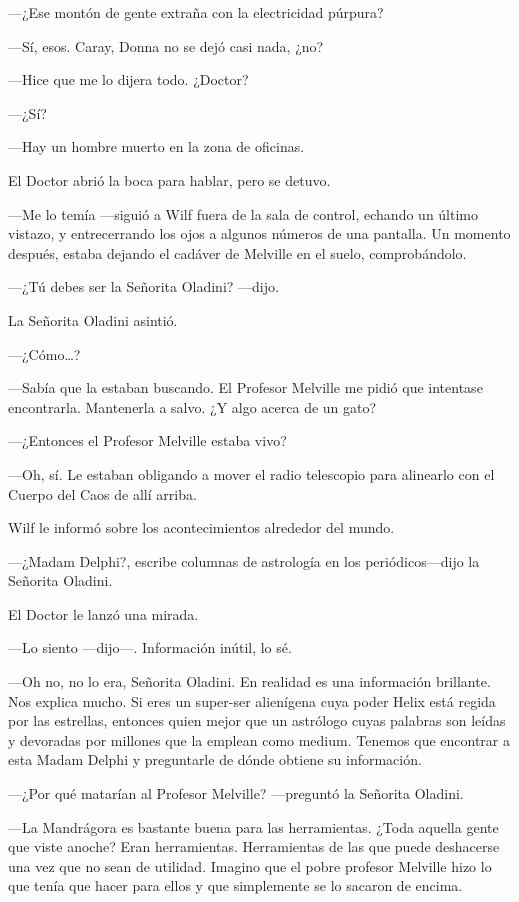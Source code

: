 ---¿Ese montón de gente extraña con la electricidad púrpura?

---Sí, esos. Caray, Donna no se dejó casi nada, ¿no?

---Hice que me lo dijera todo. ¿Doctor?

---¿Sí?

---Hay un hombre muerto en la zona de oficinas.

El Doctor abrió la boca para hablar, pero se detuvo.

---Me lo temía ---siguió a Wilf fuera de la sala de control, echando un
último vistazo, y entrecerrando los ojos a algunos números de una
pantalla. Un momento después, estaba dejando el cadáver de Melville en
el suelo, comprobándolo.

---¿Tú debes ser la Señorita Oladini? ---dijo.

La Señorita Oladini asintió.

---¿Cómo\ldots{}?

---Sabía que la estaban buscando. El Profesor Melville me pidió que
intentase encontrarla. Mantenerla a salvo. ¿Y algo acerca de un gato?

---¿Entonces el Profesor Melville estaba vivo?

---Oh, sí. Le estaban obligando a mover el radio telescopio para
alinearlo con el Cuerpo del Caos de allí arriba.

Wilf le informó sobre los acontecimientos alrededor del mundo.

---¿Madam Delphi?, escribe columnas de astrología en los
periódicos---dijo la Señorita Oladini.

El Doctor le lanzó una mirada.

---Lo siento ---dijo---. Información inútil, lo sé.

---Oh no, no lo era, Señorita Oladini. En realidad es una información
brillante. Nos explica mucho. Si eres un super-ser alienígena cuya poder
Helix está regida por las estrellas, entonces quien mejor que un
astrólogo cuyas palabras son leídas y devoradas por millones que la
emplean como medium. Tenemos que encontrar a esta Madam Delphi y
preguntarle de dónde obtiene su información.

---¿Por qué matarían al Profesor Melville? ---preguntó la Señorita
Oladini.

---La Mandrágora es bastante buena para las herramientas. ¿Toda aquella
gente que viste anoche? Eran herramientas. Herramientas de las que
puede deshacerse una vez que no sean de utilidad. Imagino que el pobre
profesor Melville hizo lo que tenía que hacer para ellos y que
simplemente se lo sacaron de encima.

